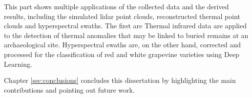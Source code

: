 \small \noindent \textbf{} \normalsize\hspace{\partTabSize} This part shows multiple applications of the collected data and the derived results, including the simulated \acrshort{lidar} point clouds, reconstructed thermal point clouds and hyperspectral swaths. The first are Thermal infrared data are applied to the detection of thermal anomalies that may be linked to buried remains at an archaeological site. Hyperspectral swaths are, on the other hand, corrected and processed for the classification of red and white grapevine varieties using Deep Learning.

\small \noindent \textbf{} \normalsize\hspace{\partTabSize} Chapter \ref{sec:conclusions} concludes this dissertation by highlighting the main contributions and pointing out future work.